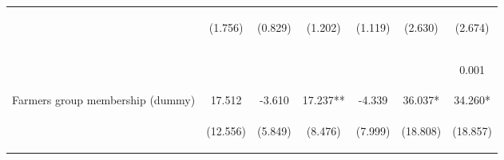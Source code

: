 \begin{center}
\begin{tabular}{lcccccc}
 & \begin{footnotesize}(1.756)\end{footnotesize} & \begin{footnotesize}(0.829)\end{footnotesize} & \begin{footnotesize}(1.202)\end{footnotesize} & \begin{footnotesize}(1.119)\end{footnotesize} & \begin{footnotesize}(2.630)\end{footnotesize} & \begin{footnotesize}(2.674)\end{footnotesize} \\
\vspace{4pt} & \begin{footnotesize}[0.361]\end{footnotesize} & \begin{footnotesize}[0.000]\end{footnotesize} & \begin{footnotesize}[0.940]\end{footnotesize} & \begin{footnotesize}[0.145]\end{footnotesize} & \begin{footnotesize}[0.000]\end{footnotesize} & \begin{footnotesize}0.001\end{footnotesize} \\
Farmers group membership (dummy) & 17.512 & -3.610 & 17.237** & -4.339 & 36.037* & 34.260* \\
 & \begin{footnotesize}(12.556)\end{footnotesize} & \begin{footnotesize}(5.849)\end{footnotesize} & \begin{footnotesize}(8.476)\end{footnotesize} & \begin{footnotesize}(7.999)\end{footnotesize} & \begin{footnotesize}(18.808)\end{footnotesize} & \begin{footnotesize}(18.857)\end{footnotesize} \\

\end{tabular}
\end{center}
